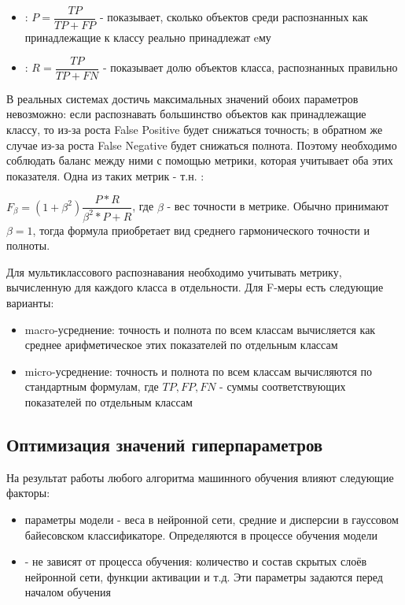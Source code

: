 \begin{itemize}
\item {}: $P=\dfrac{TP}{TP+FP}$ - показывает, сколько объектов среди распознанных как принадлежащие к классу реально принадлежат eму
\item {}: $R=\dfrac{TP}{TP+FN}$ - показывает долю объектов класса, распознанных правильно
\end{itemize}

В реальных системах достичь максимальных значений обоих параметров невозможно: если распознавать большинство объектов как принадлежащие классу, то из-за роста False Positive будет снижаться точность; в обратном же случае из-за роста False Negative будет снижаться полнота. Поэтому необходимо соблюдать баланс между ними с помощью метрики, которая учитывает оба этих показателя. Одна из таких метрик - т.н. :

$F_\beta=(1+\beta^2)\dfrac{P*R}{\beta^2*P+R}$, где $\beta$ - вес точности в метрике. Обычно принимают $\beta=1$, тогда формула приобретает вид среднего гармонического точности и полноты. 

Для мультиклассового распознавания необходимо учитывать метрику, вычисленную для каждого класса в отдельности. Для F-меры есть следующие варианты\cite{sklearn_metric}:

\begin{itemize}
\item macro-усреднение: точность и полнота по всем классам вычисляется как среднее арифметическое этих показателей по отдельным классам
\item micro-усреднение: точность и полнота по всем классам вычисляются по стандартным формулам, где $TP, FP, FN$ - суммы соответствующих показателей по отдельным классам
\end{itemize}

\subsection{Оптимизация значений гиперпараметров}

На результат работы любого алгоритма машинного обучения влияют следующие факторы:

\begin{itemize}
\item параметры модели - веса в нейронной сети, средние и дисперсии в гауссовом байесовском классификаторе. Определяются в процессе обучения модели
\item {} - не зависят от процесса обучения: количество и состав скрытых слоёв нейронной сети, функции активации и т.д. Эти параметры задаются перед началом обучения
\end{itemize}

